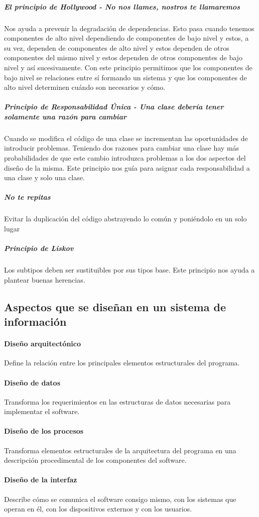 \subparagraph{El principio de Hollywood - No nos llames, nostros te llamaremos}
Nos ayuda a prevenir la degradación de dependencias. Esto pasa cuando tenemos componentes de alto nivel dependiendo de componentes de bajo nivel y estos, a su vez, dependen de componentes de alto nivel y estos dependen de otros componentes del mismo nivel y estos dependen de otros componentes de bajo nivel y así sucesivamente. Con este principio permitimos que los componentes de bajo nivel se relaciones entre sí formando un sistema y que los componentes de alto nivel determinen cuándo son necesarios y cómo.
\subparagraph{Principio de Responsabilidad Única - Una clase debería tener solamente una razón para cambiar}
Cuando se modifica el código de una clase se incrementan las oportunidades de introducir problemas. Teniendo dos razones para cambiar una clase hay más probabilidades de que este cambio introduzca problemas a los dos aspectos del diseño de la misma. Este principio nos guía para asignar cada responsabilidad a una clase y solo una clase.
\subparagraph{No te repitas}
Evitar la duplicación del código abstrayendo lo común y poniéndolo en un solo lugar
\subparagraph{Principio de Liskov}
Los subtipos deben ser sustituibles por sus tipos base. Este principio nos ayuda a plantear buenas herencias.
\subsection{Aspectos que se diseñan en un sistema de información}
\paragraph{Diseño arquitectónico}
Define la relación entre los principales elementos estructurales del programa.
\paragraph{Diseño de datos}
Transforma los requerimientos en las estructuras de datos necesarias para implementar el software.
\paragraph{Diseño de los procesos}
Transforma elementos estructurales de la arquitectura del programa en una descripción procedimental de los componentes del software.
\paragraph{Diseño de la interfaz}
Describe cómo se comunica el software consigo mismo, con los sistemas que operan en él, con los dispositivos externos y con los usuarios.
